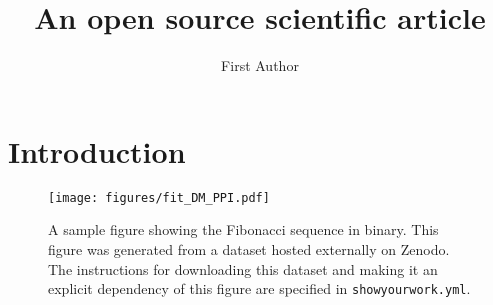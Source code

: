 \documentclass[twocolumn]{aastex63}
\begin{document}
\title{An open source scientific article}

\author{First Author}

\begin{abstract}
    \blindtext
\end{abstract}

\section{Introduction}
\Blindtext[4]


\begin{figure}[ht!]
    \begin{centering}
      \texttt{[image: figures/fit\_DM\_PPI.pdf]}
        \caption{A sample figure showing the Fibonacci sequence in binary.
            This figure was generated from a dataset hosted externally on Zenodo.
            The instructions for downloading this dataset and making it an explicit dependency of this figure are specified in \texttt{showyourwork.yml}.}
        \label{fig:fit_DM_PPI}
    \end{centering}
\end{figure}
\end{document}
